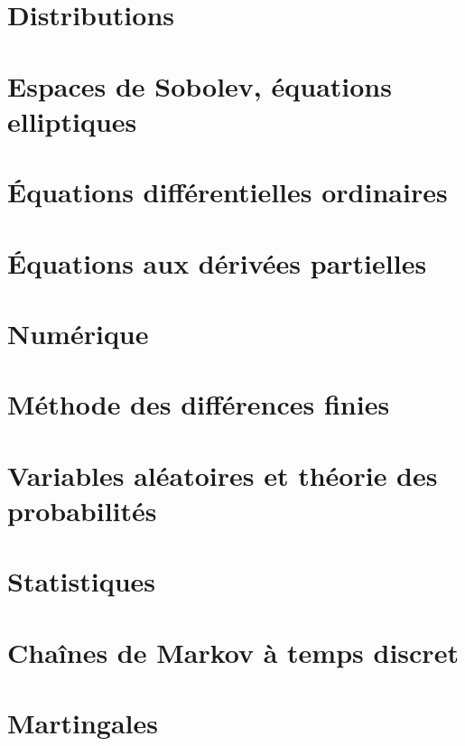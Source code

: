 \documentclass[a4paper,twoside,11pt]{book}
\begin{document}
\chapter{Distributions}


\chapter{Espaces de Sobolev, équations elliptiques}      \label{CHAPooVTIIooGOEvXT}


\chapter{Équations différentielles ordinaires}





\chapter{Équations aux dérivées partielles}


\chapter{Numérique}





\chapter{Méthode des différences finies}


\chapter{Variables aléatoires et théorie des probabilités}




\chapter{Statistiques}


\chapter{Chaînes de Markov à temps discret}


\chapter{Martingales}

\end{document}
